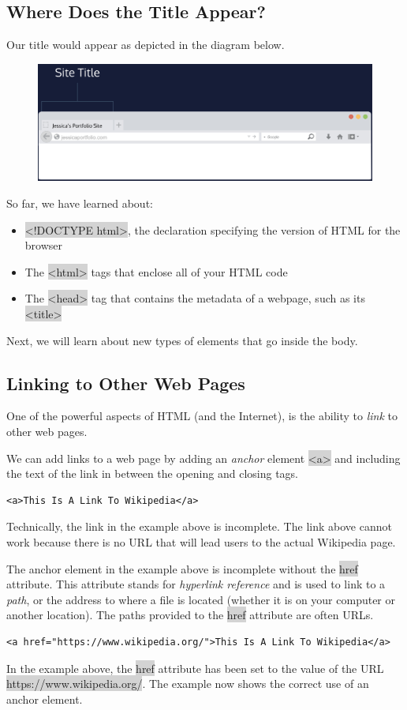\documentclass[11pt]{article}
\begin{document}
\subsection{Where Does the Title Appear?}
Our title would appear as depicted in the diagram below.
\begin{figure}[H]
\includegraphics[scale = 0.4]{1_2}
\centering
\end{figure}
So far, we have learned about:
\begin{itemize}[leftmargin = *]
\item \colorbox{lightgray}{<!DOCTYPE html>}, the declaration specifying the version of HTML for the browser
\item The \colorbox{lightgray}{<html>} tags that enclose all of your HTML code
\item The \colorbox{lightgray}{<head>} tag that contains the metadata of a webpage, such as its \colorbox{lightgray}{<title>}
\end{itemize}
Next, we will learn about new types of elements that go inside the body.

\subsection{Linking to Other Web Pages}
One of the powerful aspects of HTML (and the Internet), is the ability to \textit{link} to other web pages.

We can add links to a web page by adding an \textit{anchor} element \colorbox{lightgray}{<a>} and including the text of the link in between the opening and closing tags.
\begin{lstlisting}
<a>This Is A Link To Wikipedia</a>
\end{lstlisting}
Technically, the link in the example above is incomplete. The link above cannot work because there is no URL that will lead users to the actual Wikipedia page. 

The anchor element in the example above is incomplete without the \colorbox{lightgray}{href} attribute. This attribute stands for \textit{hyperlink reference} and is used to link to a \textit{path}, or the address to where a file is located (whether it is on your computer or another location). The paths provided to the \colorbox{lightgray}{href} attribute are often URLs.
\begin{lstlisting}
<a href="https://www.wikipedia.org/">This Is A Link To Wikipedia</a>
\end{lstlisting}
In the example above, the \colorbox{lightgray}{href} attribute has been set to the value of the URL \colorbox{lightgray}{https://www.wikipedia.org/}. The example now shows the correct use of an anchor element.
\end{document}
